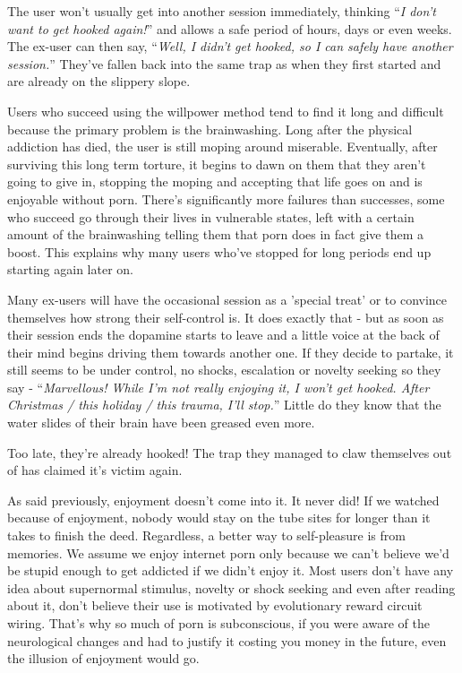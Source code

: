 \documentclass[
]{book}
\begin{document}
The user won't usually get into another session immediately, thinking ``\emph{I don't want to get hooked again!}'' and allows a safe period of hours, days or even weeks. The ex-user can then say, ``\emph{Well, I didn't get hooked, so I can safely have another session.}'' They've fallen back into the same trap as when they first started and are already on the slippery slope.

Users who succeed using the willpower method tend to find it long and difficult because the primary problem is the brainwashing. Long after the physical addiction has died, the user is still moping around miserable. Eventually, after surviving this long term torture, it begins to dawn on them that they aren't going to give in, stopping the moping and accepting that life goes on and is enjoyable without porn. There's significantly more failures than successes, some who succeed go through their lives in vulnerable states, left with a certain amount of the brainwashing telling them that porn does in fact give them a boost. This explains why many users who've stopped for long periods end up starting again later on.

Many ex-users will have the occasional session as a 'special treat' or to convince themselves how strong their self-control is. It does exactly that - but as soon as their session ends the dopamine starts to leave and a little voice at the back of their mind begins driving them towards another one. If they decide to partake, it still seems to be under control, no shocks, escalation or novelty seeking so they say - ``\emph{Marvellous! While I'm not really enjoying it, I won't get hooked. After Christmas / this holiday / this trauma, I'll stop.}'' Little do they know that the water slides of their brain have been greased even more.

Too late, they're already hooked! The trap they managed to claw themselves out of has claimed it's victim again.

As said previously, enjoyment doesn't come into it. It never did! If we watched because of enjoyment, nobody would stay on the tube sites for longer than it takes to finish the deed. Regardless, a better way to self-pleasure is from memories. We assume we enjoy internet porn only because we can't believe we'd be stupid enough to get addicted if we didn't enjoy it. Most users don't have any idea about supernormal stimulus, novelty or shock seeking and even after reading about it, don't believe their use is motivated by evolutionary reward circuit wiring. That's why so much of porn is subconscious, if you were aware of the neurological changes and had to justify it costing you money in the future, even the illusion of enjoyment would go.
\end{document}
